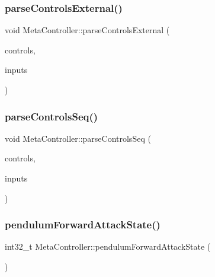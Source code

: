 \mbox{\label{class_meta_controller_a04a33cca84424c10d37cddecb663f619}} 
\subsubsection{\texorpdfstring{parse\+Controls\+External()}{parseControlsExternal()}}
{\footnotesize\ttfamily void Meta\+Controller\+::parse\+Controls\+External (\begin{DoxyParamCaption}\item[{\mbox{\hyperlink{class_via_controls}{Via\+Controls}} $\ast$}]{controls,  }\item[{\mbox{\hyperlink{class_via_input_streams}{Via\+Input\+Streams}} $\ast$}]{inputs }\end{DoxyParamCaption})}

\mbox{\label{class_meta_controller_ac337c31f2c24c6a51684a44c8947e178}} 
\subsubsection{\texorpdfstring{parse\+Controls\+Seq()}{parseControlsSeq()}}
{\footnotesize\ttfamily void Meta\+Controller\+::parse\+Controls\+Seq (\begin{DoxyParamCaption}\item[{\mbox{\hyperlink{class_via_controls}{Via\+Controls}} $\ast$}]{controls,  }\item[{\mbox{\hyperlink{class_via_input_streams}{Via\+Input\+Streams}} $\ast$}]{inputs }\end{DoxyParamCaption})}

\mbox{\label{class_meta_controller_abf6bdd57f10954b720d7ffa022b9a153}} 
\subsubsection{\texorpdfstring{pendulum\+Forward\+Attack\+State()}{pendulumForwardAttackState()}}
{\footnotesize\ttfamily int32\+\_\+t Meta\+Controller\+::pendulum\+Forward\+Attack\+State (\begin{DoxyParamCaption}\item[{void}]{ }\end{DoxyParamCaption})}

